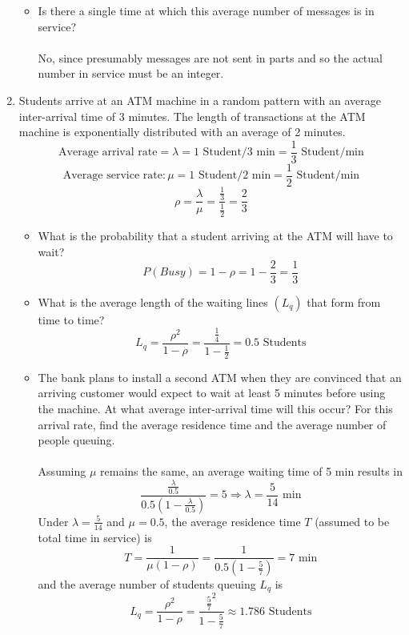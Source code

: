 \documentclass[12pt]{article}
\begin{document}
\begin{enumerate}
\begin{itemize}
  \item Is there a single time at which this average number of messages is in service? \\ \\
    No, since presumably messages are not sent in parts and so the actual number in service must be an integer.
  \end{itemize}
\newpage
\item Students arrive at an ATM machine in a random pattern with an average inter-arrival time of 3 minutes. The length of transactions at the ATM machine is exponentially distributed with an average of 2 minutes.
  \[ \textrm{Average arrival rate} = \lambda = 1\textrm{ Student}/3\textrm{ min} = \frac{1}{3} \textrm{ Student/min}\]
  \[ \textrm{Average service rate} : \mu = 1\textrm{ Student}/2\textrm{ min} = \frac{1}{2} \textrm{ Student/min}\]
  \[ \rho = \frac{\lambda}{\mu} = \frac{\frac{1}{3}}{\frac{1}{2}} = \frac{2}{3} \]
  \begin{itemize}
  \item What is the probability that a student arriving at the ATM will have to wait? 
    \[ P(Busy) = 1 - \rho = 1 - \frac{2}{3} = \frac{1}{3} \]
  \item What is the average length of the waiting lines $(L_q)$ that form from time to time? 
    \[ L_q = \frac{\rho^2}{1-\rho} = \frac{\frac{1}{4}}{1-\frac{1}{2}} = 0.5 \textrm{ Students}  \]
  \item The bank plans to install a second ATM when they are convinced that an arriving customer would expect to wait at least 5 minutes before using the machine. At what average inter-arrival time will this occur? For this arrival rate, find the average residence time and the average number of people queuing. \\ \\
    Assuming $\mu$ remains the same, an average waiting time of 5 min results in
    \[ \frac{\frac{\lambda}{0.5}}{0.5(1-\frac{\lambda}{0.5})} = 5 \Rightarrow \lambda = \frac{5}{14} \textrm{ min}\]
    Under $\lambda = \frac{5}{14}$ and $\mu = 0.5$, the average residence time $T$ (assumed to be total time in service) is 
    \[ T = \frac{1}{\mu(1-\rho)} = \frac{1}{0.5(1-\frac{5}{7})} = 7 \textrm{ min} \]
    and the average number of students queuing $L_q$ is 
    \[ L_q =  \frac{\rho^2}{1-\rho} = \frac{\frac{5}{7}^2}{1-\frac{5}{7}} \approx 1.786 \textrm{ Students} \]
  \end{itemize}


\end{enumerate}
\end{document}
